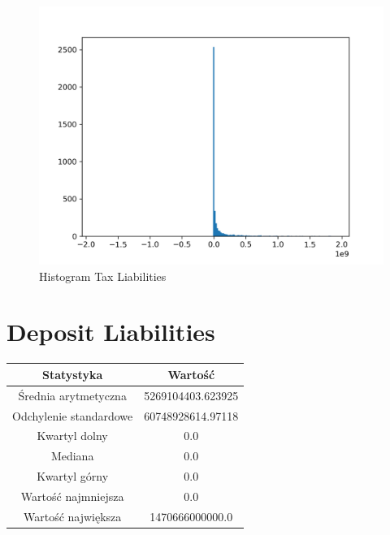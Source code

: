 \documentclass{article}
\begin{document}
\begin{figure}[h!]
    \includegraphics[width=\linewidth]{variables/Tax Liabilities.png}
    \caption{Histogram Tax Liabilities }
\end{figure}\section{ Deposit Liabilities }

\begin{center}
    \begin{tabular}{|c | c|} 
    \hline
    Statystyka & Wartość \\
    \hline\hline
    Średnia arytmetyczna & 5269104403.623925 \\ 
    \hline
    Odchylenie standardowe & 60748928614.97118 \\
    \hline
    Kwartyl dolny & 0.0 \\
    \hline
    Mediana & 0.0 \\
    \hline
    Kwartyl górny & 0.0 \\
    \hline
    Wartość najmniejsza & 0.0 \\
    \hline
    Wartość największa & 1470666000000.0 \\
    \hline
   \end{tabular}
\end{center}
\end{document}
